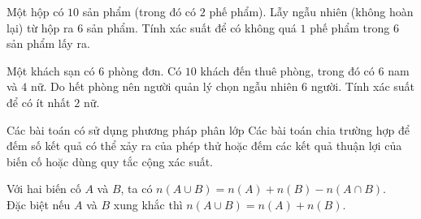 \begin{bt}
	Một hộp có $10$ sản phẩm (trong đó có $2$ phế phẩm). Lẫy ngẫu nhiên (không hoàn lại) từ hộp ra $6$ sản phẩm. Tính xác suất để có không quá $1$ phế phẩm trong $6$ sản phẩm lấy ra.
\end{bt}
\begin{bt}
	Một khách sạn có $6$ phòng đơn. Có $10$ khách đến thuê phòng, trong đó có $6$ nam và $4$ nữ. Do hết phòng nên người quản lý chọn ngẫu nhiên $6$ người. Tính xác suất để có ít nhất $2$ nữ.
\end{bt}
\begin{dang}{Các bài toán có sử dụng phương pháp phân lớp}
	Các bài toán chia trường hợp để đếm số kết quả có thể xảy ra của phép thử hoặc đếm các kết quả thuận lợi của biến cố hoặc dùng quy tắc cộng xác suất.
	\begin{note}
	Với hai biến cố $A$ và $B$, ta có $n(A\cup B)=n(A)+n(B)-n(A\cap B)$.\\
	Đặc biệt nếu $A$ và $B$ xung khắc thì $n(A\cup B)=n(A)+n(B)$.
	\end{note}
\end{dang}

